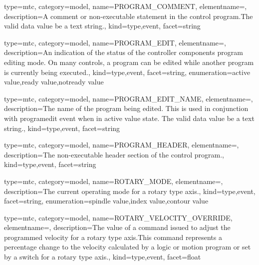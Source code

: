 {
  type=mtc,
  category=model,
  name={PROGRAM\_COMMENT},
  elementname=,
  description={A comment or non-executable statement in the control program.\newline The \gls{valid data value} \must be a text string.},
  kind={type,event},
  facet={\gls{string}}
}


{
  type=mtc,
  category=model,
  name={PROGRAM\_EDIT},
  elementname=,
  description={An indication of the status of the \gls{controller} components program editing mode. \newline On many controls, a program can be edited while another program is currently being executed.},
  kind={type,event},
  facet={\gls{string}},
  enumeration={\gls{active value},\gls{ready value},\gls{notready value}}
}


{
  type=mtc,
  category=model,
  name={PROGRAM\_EDIT\_NAME},
  elementname=,
  description={The name of the program being edited. \newline This is used in conjunction with \gls{programedit event} when in \gls{active value} state. \newline The \gls{valid data value} \must be a text string.},
  kind={type,event},
  facet={\gls{string}}
}


{
  type=mtc,
  category=model,
  name={PROGRAM\_HEADER},
  elementname=,
  description={The non-executable header section of the control program.},
  kind={type,event},
  facet={\gls{string}}
}


{
  type=mtc,
  category=model,
  name={ROTARY\_MODE},
  elementname=,
  description={The current operating mode for a \gls{rotary} type axis.},
  kind={type,event},
  facet={\gls{string}},
  enumeration={\gls{spindle value},\gls{index value},\gls{contour value}}
}


{
  type=mtc,
  category=model,
  name={ROTARY\_VELOCITY\_OVERRIDE},
  elementname=,
  description={The value of a command issued to adjust the programmed velocity for a \gls{rotary} type axis.\newline This command represents a percentage change to the velocity calculated by a logic or motion program or set by a switch for a \gls{rotary} type axis.},
  kind={type,event},
  facet={\gls{float}}
}


